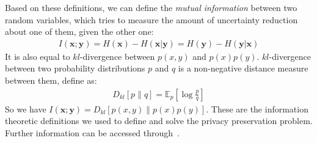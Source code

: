 \documentclass[10pt,journal,compsoc]{IEEEtran}
\begin{document}
Based on these definitions, we can define the \emph{mutual information} between two random variables, which tries to measure the amount of uncertainty reduction about one of them, given the other one:
\begin{align*}
I(\textbf{x};\textbf{y}) = H(\textbf{x}) - H(\textbf{x}|\textbf{y}) = H(\textbf{y}) - H(\textbf{y}|\textbf{x})
\end{align*}
It is also equal to $kl$-divergence between $p(x,y)$ and $p(x)p(y)$. $kl$-divergence between two probability distributions $p$ and $q$ is a non-negative distance measure between them, define as:
\begin{align*}
D_{kl}[p\|q] = \mathds{E}_p [\log \frac{p}{q}]
\end{align*}
So we have $I(\textbf{x};\textbf{y}) = D_{kl}[p(x,y)\|p(x)p(y)]$. These are the information theoretic definitions we used to define and solve the privacy preservation problem. Further information can be accessed through~\cite{cover2012}.
\end{document}
